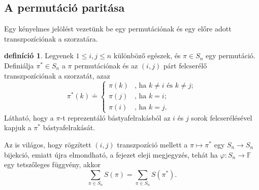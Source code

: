 \documentclass[9pt, a4paper, showtrims]{memoir}
\theoremstyle{plain}
\theoremstyle{remark}
\theoremstyle{definition}
\newtheorem{definition}[proposition]{definíció}
\begin{document}
\subsection{A permutáció paritása}
Egy kényelmes jelölést vezetünk be egy permutációnak és egy előre adott transzpozíciónak a szorzatára.
\begin{definition}
    Legyenek $1\leq i,j\leq n$ különböző egészek, 
    és $\pi \in S_{n}$ egy permutáció. 
    Definiálja $\pi ^{\ast }\in S_{n}$ a $\pi$ permutációnak és az $\left( i,j \right)$ párt felcserélő transzpozíciónak a szorzatát, 
    azaz
    \[
    \pi ^{\ast }\left( k\right) \doteq \left\{ 
    \begin{array}{ll}
    \pi \left( k\right)  & 
    \text{, ha }k\neq i\text{ és }k\neq j; \\ 
    \pi \left( j\right)  & \text{, ha }k=i; \\ 
    \pi \left( i\right)  & \text{, ha }k=j.
    \end{array}
    \right. 
    \]
    Látható, 
    hogy a $\pi$-t reprezentáló bástyafelrakásból az $i$ és $j$ sorok felcserélésével kapjuk a $\pi^{\ast}$ bástyafelrakását.
\end{definition}
Az is világos, hogy rögzített $\left( i,j \right)$ transzpozíció mellett a $\pi\mapsto\pi^\ast$ egy $S_n\to S_n$ bijekció,
emiatt újra elmondható, a fejezet eleji megjegyzés, 
tehát ha $\varphi:S_n\to\mathbb{F}$ egy tetszőleges függvény, akkor
\[
    \sum_{\pi\in S_n}S\left( \pi \right)
    =
    \sum_{\pi\in S_n}S\left( \pi^\ast \right).
\]
\end{document}
